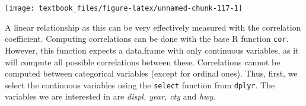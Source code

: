 \documentclass[]{tufte-book}
\newenvironment{Shaded}{}{}
\newcommand{\KeywordTok}[1]{\textcolor[rgb]{0.00,0.44,0.13}{\textbf{#1}}}
\newcommand{\NormalTok}[1]{#1}
\newcommand{\OperatorTok}[1]{\textcolor[rgb]{0.40,0.40,0.40}{#1}}
\newcommand{\StringTok}[1]{\textcolor[rgb]{0.25,0.44,0.63}{#1}}
\begin{document}
\texttt{[image: textbook\_files/figure-latex/unnamed-chunk-117-1]}

A linear relationship as this can be very effectively measured with the correlation coefficient. Computing correlations can be done with the base R function \texttt{cor}. However, this function expects a data.frame with only continuous variables, as it will compute all possible correlations between these. Correlations cannot be computed between categorical variables (except for ordinal ones). Thus, first, we select the continuous variables using the \texttt{select} function from \texttt{dplyr}. The variables we are interested in are \emph{displ, year, cty} and \emph{hwy}.

\begin{Shaded}
\end{Shaded}
\end{document}
